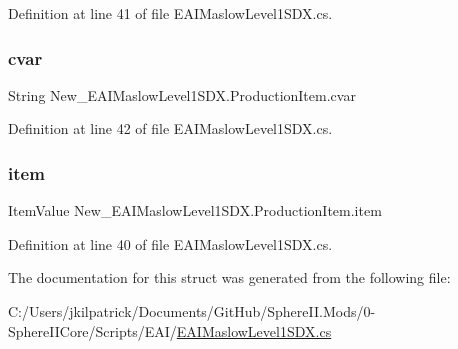 Definition at line 41 of file E\+A\+I\+Maslow\+Level1\+S\+D\+X.\+cs.

\mbox{\label{struct_new___e_a_i_maslow_level1_s_d_x_1_1_production_item_abe400ee4841645288f8262717d7aa955}} 
\subsubsection{\texorpdfstring{cvar}{cvar}}
{\footnotesize\ttfamily String New\+\_\+\+E\+A\+I\+Maslow\+Level1\+S\+D\+X.\+Production\+Item.\+cvar}



Definition at line 42 of file E\+A\+I\+Maslow\+Level1\+S\+D\+X.\+cs.

\mbox{\label{struct_new___e_a_i_maslow_level1_s_d_x_1_1_production_item_ab1a604a6c64a3b514e144a9da04234c3}} 
\subsubsection{\texorpdfstring{item}{item}}
{\footnotesize\ttfamily Item\+Value New\+\_\+\+E\+A\+I\+Maslow\+Level1\+S\+D\+X.\+Production\+Item.\+item}



Definition at line 40 of file E\+A\+I\+Maslow\+Level1\+S\+D\+X.\+cs.



The documentation for this struct was generated from the following file\+:\begin{DoxyCompactItemize}
\item 
C\+:/\+Users/jkilpatrick/\+Documents/\+Git\+Hub/\+Sphere\+I\+I.\+Mods/0-\/\+Sphere\+I\+I\+Core/\+Scripts/\+E\+A\+I/\mbox{\hyperlink{_e_a_i_maslow_level1_s_d_x_8cs}{E\+A\+I\+Maslow\+Level1\+S\+D\+X.\+cs}}\end{DoxyCompactItemize}
